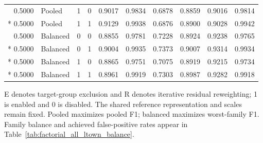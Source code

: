 \begin{longtable}{@{}rlccrrrrrr@{}}
0.5000 & Pooled & 1 & 0 & 0.9017 & 0.9834 & 0.6878 & 0.8859 & 0.9016 & 0.9814 \\*
0.5000 & Pooled & 1 & 1 & 0.9129 & 0.9938 & 0.6876 & 0.8900 & 0.9028 & 0.9942 \\
\midrule
0.5000 & Balanced & 0 & 0 & 0.8855 & 0.9781 & 0.7228 & 0.8924 & 0.9238 & 0.9765 \\*
0.5000 & Balanced & 0 & 1 & 0.9004 & 0.9935 & 0.7373 & 0.9007 & 0.9314 & 0.9934 \\*
0.5000 & Balanced & 1 & 0 & 0.8865 & 0.9751 & 0.7075 & 0.8919 & 0.9215 & 0.9734 \\*
0.5000 & Balanced & 1 & 1 & 0.8961 & 0.9919 & 0.7303 & 0.8987 & 0.9282 & 0.9918 \\
\end{longtable}
\noindent\footnotesize E denotes target-group exclusion and R denotes iterative residual reweighting; 1 is enabled and 0 is disabled. The shared reference representation and scales remain fixed. Pooled maximizes pooled F1; balanced maximizes worst-family F1. Family balance and achieved false-positive rates appear in Table~\ref{tab:factorial_all_ltown_balance}.
\par\endgroup
